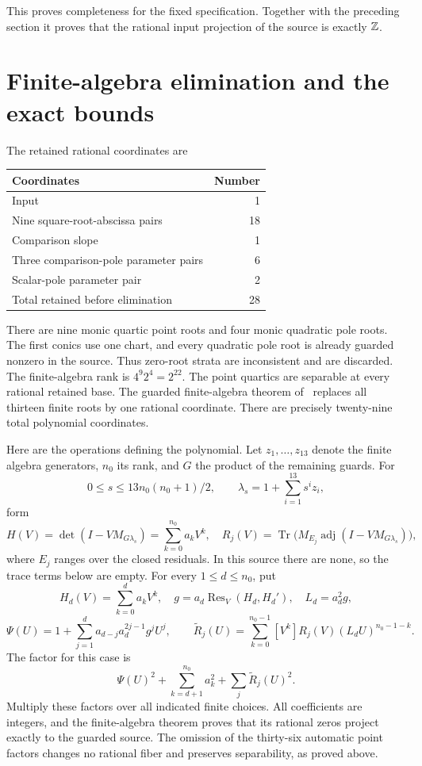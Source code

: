 \documentclass[11pt,a4paper]{article}
\begin{document}
This proves completeness for the fixed specification. Together with
the preceding section it proves that the rational input projection
of the source is exactly $\mathbb Z$.

\section{Finite-algebra elimination and the exact bounds}

The retained rational coordinates are
\begin{center}
\begin{tabular}{lr}
\toprule
Coordinates & Number\\
\midrule
Input & 1\\
Nine square-root-abscissa pairs & 18\\
Comparison slope & 1\\
Three comparison-pole parameter pairs & 6\\
Scalar-pole parameter pair & 2\\
\midrule
Total retained before elimination & 28\\
\bottomrule
\end{tabular}
\end{center}
There are nine monic quartic point roots and four monic
quadratic pole roots. The first conics use one chart, and every
quadratic pole root is already guarded nonzero in the source.
Thus zero-root strata are inconsistent and are discarded.
The finite-algebra rank is $4^9 2^4=2^{22}$.
The point quartics are separable at every rational retained base.
The guarded finite-algebra theorem of~\cite{Baseline} replaces
all thirteen finite roots by one rational coordinate. There are
precisely twenty-nine total polynomial coordinates.

Here are the operations defining the polynomial. Let
$z_1,\ldots,z_{13}$ denote the
finite algebra generators, $n_0$ its rank, and $G$ the product
of the remaining guards. For
\[
 0\le s\le13n_0(n_0+1)/2,
 \qquad\lambda_s=1+\sum_{i=1}^{13}s^i z_i,
\]
form
\[
 H(V)=\det(I-VM_{G\lambda_s})=\sum_{k=0}^{n_0}a_kV^k,
 \quad
 R_j(V)=\operatorname{Tr}\bigl(M_{E_j}\operatorname{adj}
                   (I-VM_{G\lambda_s})\bigr),
\]
where $E_j$ ranges over the closed residuals. In this source
there are none, so the trace terms below are empty. For every
$1\le d\le n_0$, put
\[
 H_d(V)=\sum_{k=0}^d a_kV^k,\quad
 g=a_d\operatorname{Res}_V(H_d,H_d'),\quad L_d=a_d^2g,
\]
\[
 \Psi(U)=1+\sum_{j=1}^d a_{d-j}a_d^{2j-1}g^jU^j,
 \qquad
 \widetilde R_j(U)=\sum_{k=0}^{n_0-1}[V^k]R_j(V)
                                      (L_dU)^{n_0-1-k}.
\]
The factor for this case is
\[
            \Psi(U)^2+\sum_{k=d+1}^{n_0}a_k^2
                              +\sum_j\widetilde R_j(U)^2.
\]
Multiply these factors over all indicated finite choices. All
coefficients are integers, and the finite-algebra theorem proves
that its rational zeros project exactly to the guarded source.
The omission of the thirty-six automatic point factors changes
no rational fiber and preserves separability, as proved above.
\end{document}
